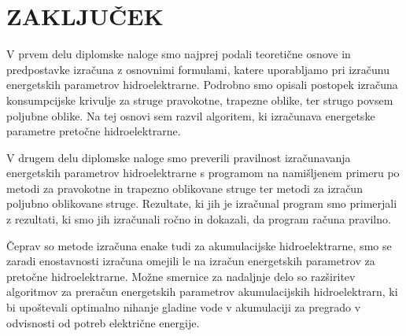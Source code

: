 
\chapter{ZAKLJUČEK}

V prvem delu diplomske naloge smo najprej podali teoretične osnove in predpostavke izračuna z osnovnimi formulami, katere uporabljamo pri izračunu energetskih parametrov hidroelektrarne. Podrobno smo opisali postopek izračuna konsumpcijske krivulje za struge pravokotne, trapezne oblike, ter strugo povsem poljubne oblike. Na tej osnovi sem razvil algoritem, ki izračunava energetske parametre pretočne hidroelektrarne.


V drugem delu diplomske naloge smo preverili pravilnost izračunavanja energetskih parametrov hidroelektrarne s programom na namišljenem primeru po metodi za pravokotne in trapezno oblikovane struge ter metodi za izračun poljubno oblikovane struge. Rezultate, ki jih je izračunal program smo primerjali z rezultati, ki smo jih izračunali ročno in dokazali, da program računa pravilno.

 Čeprav so metode izračuna enake tudi za akumulacijske hidroelektrarne, smo se zaradi enostavnosti izračuna omejili le na izračun energetskih parametrov za pretočne hidroelektrarne. Možne smernice za nadaljnje delo so razširitev algoritmov za preračun energetskih parametrov akumulacijskih hidroelektrarn, ki bi upoštevali optimalno nihanje gladine vode v akumulaciji za pregrado v odvisnosti od potreb električne energije.



